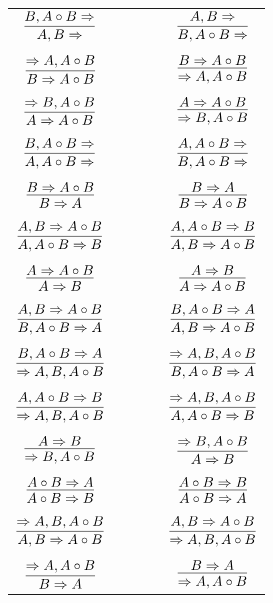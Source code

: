 \documentclass[11pt]{article}
\begin{document}
\begin{center}
\begin{tabular}{ccc}
$\infer{A, B\Rightarrow }{B, A\circ B\Rightarrow }$ & \ \ \ \ & $\infer{B, A\circ B\Rightarrow }{A, B\Rightarrow }$ \\
&& \\
$\infer{B\Rightarrow A\circ B}{\Rightarrow A, A\circ B}$ && $\infer{\Rightarrow A, A\circ B}{B\Rightarrow A\circ B}$ \\
&& \\
$\infer{A\Rightarrow A\circ B}{\Rightarrow B, A\circ B}$ && $\infer{\Rightarrow B, A\circ B}{A\Rightarrow A\circ B}$ \\
&& \\
$\infer{A, A\circ B\Rightarrow }{B, A\circ B\Rightarrow }$ && $\infer{B, A\circ B\Rightarrow }{A, A\circ B\Rightarrow }$ \\
&& \\
$\infer{B\Rightarrow A}{B\Rightarrow A\circ B}$ && $\infer{B\Rightarrow A\circ B}{B\Rightarrow A}$ \\
&& \\
$\infer{A, A\circ B\Rightarrow B}{A, B\Rightarrow A\circ B}$ && $\infer{A, B\Rightarrow A\circ B}{A, A\circ B\Rightarrow B}$ \\
&& \\
$\infer{A\Rightarrow B}{A\Rightarrow A\circ B}$ && $\infer{A\Rightarrow A\circ B}{A\Rightarrow B}$ \\
&& \\
$\infer{B, A\circ B\Rightarrow A}{A, B\Rightarrow A\circ B}$ && $\infer{A, B\Rightarrow A\circ B}{B, A\circ B\Rightarrow A}$ \\
&& \\
$\infer{\Rightarrow A, B, A\circ B}{B, A\circ B\Rightarrow A}$ && $\infer{B, A\circ B\Rightarrow A}{\Rightarrow A, B, A\circ B}$ \\
&& \\
$\infer{\Rightarrow A, B, A\circ B}{A, A\circ B\Rightarrow B}$ && $\infer{A, A\circ B\Rightarrow B}{\Rightarrow A, B, A\circ B}$ \\
&& \\
$\infer{\Rightarrow B, A\circ B}{A\Rightarrow B}$ && $\infer{A\Rightarrow B}{\Rightarrow B, A\circ B}$ \\
&& \\
$\infer{A\circ B\Rightarrow B}{A\circ B\Rightarrow A}$ && $\infer{A\circ B\Rightarrow A}{A\circ B\Rightarrow B}$ \\
&& \\
$\infer{A, B\Rightarrow A\circ B}{\Rightarrow A, B, A\circ B}$ && $\infer{\Rightarrow A, B, A\circ B}{A, B\Rightarrow A\circ B}$ \\
&& \\
$\infer{B\Rightarrow A}{\Rightarrow A, A\circ B}$ && $\infer{\Rightarrow A, A\circ B}{B\Rightarrow A}$ \\
\end{tabular}


\end{center}
\end{document}
